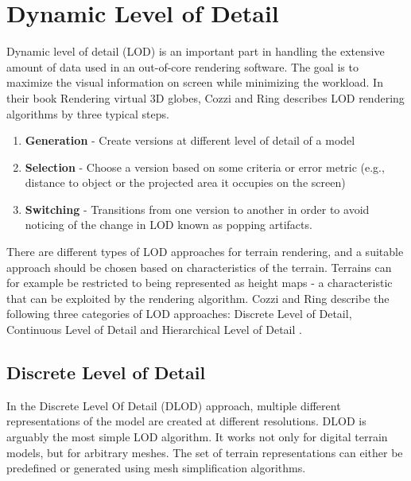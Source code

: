 \section{Dynamic Level of Detail}
Dynamic level of detail (LOD) is an important part in handling the extensive amount of data used in an out-of-core rendering software. The goal is to maximize the visual information on screen while minimizing the workload. In their book Rendering virtual 3D globes, Cozzi and Ring describes LOD rendering algorithms by three typical steps. \cite[p. 367]{cozzi11}

\begin{enumerate}
    \item \textbf{Generation} - Create versions at different level of detail of a model
    \item \textbf{Selection} - Choose a version based on some criteria or error metric (e.g., distance to object or the projected area it occupies on the screen)
    \item \textbf{Switching} - Transitions from one version to another in order to avoid noticing of the change in LOD known as popping artifacts.
\end{enumerate}

There are different types of LOD approaches for terrain rendering, and a suitable approach should be chosen based on characteristics of the terrain. Terrains can for example be restricted to being represented as height maps - a characteristic that can be exploited by the rendering algorithm. Cozzi and Ring describe the following three categories of LOD approaches: Discrete Level of Detail, Continuous Level of Detail and Hierarchical Level of Detail \cite[p. 368-371]{cozzi11}.

\subsection{Discrete Level of Detail}
In the Discrete Level Of Detail (DLOD) approach, multiple different representations of the model are created at different resolutions. DLOD is arguably the most simple LOD algorithm. It works not only for digital terrain models, but for arbitrary meshes. The set of terrain representations can either be predefined or generated using mesh simplification algorithms.

